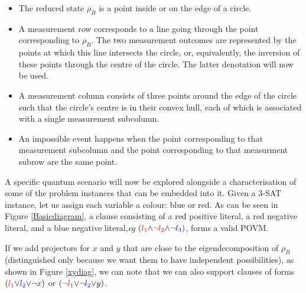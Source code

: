 \documentclass[reprint]{revtex4-1}
\theoremstyle{definition}
\begin{document}
\begin{itemize}
\item The reduced state $\rho_B$ is a point inside or on the edge of a circle.

\item A measurement row corresponds to a line going through the point corresponding to $\rho_B$. The two measurement outcomes are represented by the points at which this line intersects the circle, or, equivalently, the inversion of these points through the centre of the circle. The latter denotation will now be used.

\item A measurement column consists of three points around the edge of the circle such that the circle's centre is in their convex hull, each of which is associated with a single measurement subcolumn.

\item An impossible event happens when the point corresponding to that measurement subcolumn and the point corresponding to that measurment subrow are the same point.
\end{itemize}

A specific quantum scenario will now be explored alongside a characterisation of some of the problem instances that can be embedded into it. Given a \textsc{3-SAT} instance, let us assign each variable a colour: blue or red. As can be seen in Figure \ref{Basicdiagram}, a clause consisting of a red positive literal, a red negative literal, and a blue negative literal,\emph{eg} $(\color{red}{l_1} \color{black}{\wedge} \color{red}{\neg l_2} \color{black}{\wedge} \color{blue}{\neg l_3})$, forms a valid POVM.

If we add projectors for $x$ and $y$ that are close to the eigendecomposition of $\rho_B$ (distinguished only because we want them to have independent possibilities), as shown in Figure \ref{xydiag}, we can note that we can also support clauses of forms $(\color{red}{l_1} \color{black}{\vee} \color{blue}{ l_2} \color{black}{\vee} \neg x)$ or $(\color{red}{\neg l_1} \color{black}{\vee} \color{blue}{\neg l_2} \color{black}{\vee} y)$.
\end{document}
